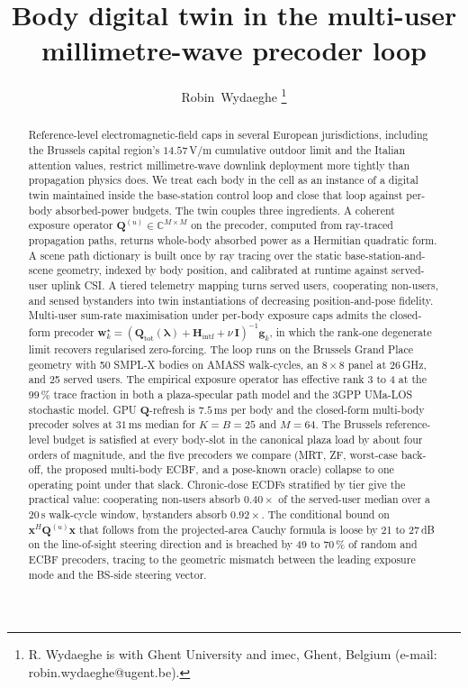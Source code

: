 \documentclass[journal,twocolumn,10pt]{IEEEtran}
\title{Body digital twin in the multi-user
millimetre-wave precoder loop}
\author{Robin~Wydaeghe%
  \thanks{R. Wydaeghe is with Ghent University and imec, Ghent, Belgium
  (e-mail: robin.wydaeghe@ugent.be).}}
\theoremstyle{plain}
\theoremstyle{remark}
\newcommand{\xx}{\mathbf{x}}
\newcommand{\ww}{\mathbf{w}}
\newcommand{\gvec}{\mathbf{g}}
\newcommand{\Qmat}{\mathbf{Q}}
\newcommand{\Hintf}{\mathbf{H}_{\mathrm{intf}}}
\newcommand{\Complex}{\mathbb{C}}
\begin{document}
\maketitle

\begin{abstract}
Reference-level electromagnetic-field caps in several European
jurisdictions, including the Brussels capital region's $14.57\,$V/m
cumulative outdoor limit and the Italian attention values, restrict
millimetre-wave downlink deployment more tightly than propagation
physics does. We treat each body in the cell as an instance of a
digital twin maintained inside the base-station control loop and
close that loop against per-body absorbed-power budgets. The twin
couples three ingredients. A coherent exposure operator
$\Qmat^{(u)} \in \Complex^{M \times M}$ on the precoder, computed
from ray-traced propagation paths, returns whole-body absorbed power
as a Hermitian quadratic form. A scene path dictionary is built once
by ray tracing over the static base-station-and-scene geometry,
indexed by body position, and calibrated at runtime against served-user
uplink CSI. A tiered telemetry mapping turns served users, cooperating
non-users, and sensed bystanders into twin instantiations of
decreasing position-and-pose fidelity. Multi-user sum-rate maximisation
under per-body exposure caps admits the closed-form precoder
$\ww_k^\star = (\Qmat_{\mathrm{tot}}(\bm\lambda) + \Hintf +
\nu\,\mathbf{I})^{-1} \gvec_k$, in which the rank-one degenerate limit
recovers regularised zero-forcing. The loop runs on the Brussels Grand Place geometry with
50 SMPL-X bodies on AMASS walk-cycles, an $8 \times 8$ panel at
$26\,$GHz, and 25 served users. The empirical exposure operator has
effective rank 3 to 4 at the $99\,\%$ trace fraction in both a
plaza-specular path model and the 3GPP UMa-LOS stochastic model.
GPU $\Qmat$-refresh is $7.5\,$ms per body and the closed-form
multi-body precoder solves at $31\,$ms median for $K = B = 25$ and
$M = 64$. The Brussels reference-level budget is satisfied at every
body-slot in the canonical plaza load by about four orders of
magnitude, and the five precoders we compare (MRT, ZF, worst-case
back-off, the proposed multi-body ECBF, and a pose-known oracle)
collapse to one operating point under that slack. Chronic-dose
ECDFs stratified by tier give the practical value: cooperating
non-users absorb $0.40\times$ of the served-user median over a
$20\,$s walk-cycle window, bystanders absorb $0.92\times$. The
conditional bound on $\xx^H \Qmat^{(u)} \xx$ that follows from the
projected-area Cauchy formula is loose by 21 to $27\,$dB on the
line-of-sight steering direction and is breached by 49 to $70\,\%$
of random and ECBF precoders, tracing to the geometric mismatch
between the leading exposure mode and the BS-side steering vector.
\end{abstract}
\end{document}

